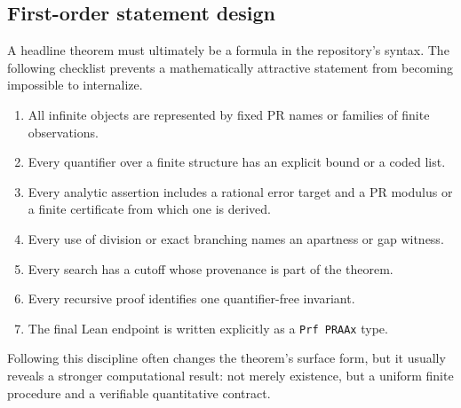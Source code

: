 \subsection{First-order statement design}

A headline theorem must ultimately be a formula in the repository's syntax.
The following checklist prevents a mathematically attractive statement from
becoming impossible to internalize.

\begin{enumerate}
\item All infinite objects are represented by fixed PR names or families of
finite observations.
\item Every quantifier over a finite structure has an explicit bound or a
coded list.
\item Every analytic assertion includes a rational error target and a PR
modulus or a finite certificate from which one is derived.
\item Every use of division or exact branching names an apartness or gap
witness.
\item Every search has a cutoff whose provenance is part of the theorem.
\item Every recursive proof identifies one quantifier-free invariant.
\item The final Lean endpoint is written explicitly as a
\texttt{Prf PRAAx} type.
\end{enumerate}

Following this discipline often changes the theorem's surface form, but it
usually reveals a stronger computational result: not merely existence, but a
uniform finite procedure and a verifiable quantitative contract.
